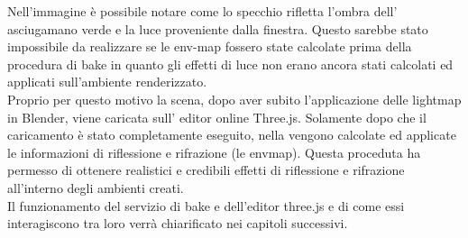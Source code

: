Nell’immagine è possibile notare come lo specchio rifletta l’ombra dell’ asciugamano verde e la luce proveniente dalla finestra. Questo sarebbe stato impossibile da realizzare se le env-map fossero state calcolate prima della procedura di bake in quanto gli effetti di luce non erano ancora stati calcolati ed applicati sull’ambiente renderizzato.
\\
Proprio per questo motivo la scena, dopo aver subito l’applicazione delle lightmap in Blender, viene  caricata sull’ editor online Three.js. Solamente dopo che il caricamento è stato completamente eseguito, nella vengono calcolate ed applicate le informazioni di riflessione e rifrazione (le envmap).
Questa proceduta ha permesso di ottenere realistici e credibili effetti di riflessione e rifrazione all’interno degli ambienti creati.
\\
Il funzionamento del servizio di bake e dell’editor three.js e di come essi interagiscono tra loro verrà chiarificato nei capitoli successivi.

